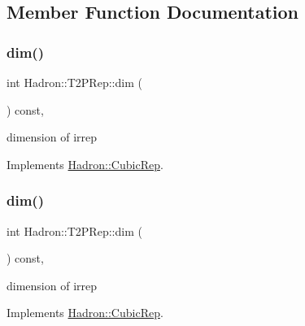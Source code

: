 \subsection{Member Function Documentation}
\mbox{\label{structHadron_1_1T2PRep_ad02168e1d6b3e149b6c49a0f5e0ee2bd}} 
\subsubsection{\texorpdfstring{dim()}{dim()}\hspace{0.1cm}{\footnotesize\ttfamily [1/3]}}
{\footnotesize\ttfamily int Hadron\+::\+T2\+P\+Rep\+::dim (\begin{DoxyParamCaption}{ }\end{DoxyParamCaption}) const\hspace{0.3cm}{\ttfamily [inline]}, {\ttfamily [virtual]}}

dimension of irrep 

Implements \mbox{\hyperlink{structHadron_1_1CubicRep_ac178d14064f037a66af4b9fb4b312d51}{Hadron\+::\+Cubic\+Rep}}.

\mbox{\label{structHadron_1_1T2PRep_ad02168e1d6b3e149b6c49a0f5e0ee2bd}} 
\subsubsection{\texorpdfstring{dim()}{dim()}\hspace{0.1cm}{\footnotesize\ttfamily [2/3]}}
{\footnotesize\ttfamily int Hadron\+::\+T2\+P\+Rep\+::dim (\begin{DoxyParamCaption}{ }\end{DoxyParamCaption}) const\hspace{0.3cm}{\ttfamily [inline]}, {\ttfamily [virtual]}}

dimension of irrep 

Implements \mbox{\hyperlink{structHadron_1_1CubicRep_ac178d14064f037a66af4b9fb4b312d51}{Hadron\+::\+Cubic\+Rep}}.

\mbox{\label{structHadron_1_1T2PRep_ad02168e1d6b3e149b6c49a0f5e0ee2bd}} 
